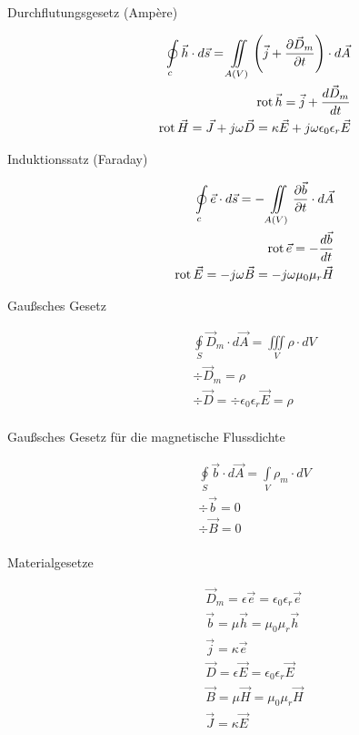 \begin{description}
\item[Durchflutungsgesetz (Ampère)]
\begin{align*}
\oint\limits_c \vec{h} \cdot d\vec{s} = \iint\limits_{A(V)} \left( \vec{j} + \frac{\partial \vec{D}_m}{\partial t}\right ) \cdot d\vec{A} \\
\text{rot}\, \vec{h} = \vec{j} + \frac{d \vec{D}_m}{d t} \\
\text{rot}\, \vec{H} = \vec{J} + j\omega \vec{D} = \kappa \vec{E} + j\omega \epsilon_0 \epsilon_r \vec{E} \\
\end{align*}

\item[Induktionssatz (Faraday)]
\begin{align*}
\oint\limits_c \vec{e} \cdot d\vec{s} = - \iint\limits_{A(V)} \frac{\partial \vec{b}}{\partial t} \cdot d\vec{A} \\
\text{rot}\, \vec{e} = - \frac{d \vec{b}}{d t} \\
\text{rot}\, \vec{E} = - j\omega\vec{B} = - j \omega \mu_0 \mu_r\vec{H}\\
\end{align*}

\item[Gaußsches Gesetz]
\begin{align*}
\oint\limits_S \vec{D}_m \cdot d\vec{A} = \iiint\limits_V \rho \cdot dV \\
\div{\vec{D}_m} = \rho \\
\div{\vec{D}} = \div{\epsilon_0 \epsilon_r \vec{E}} = \rho \\
\end{align*}

\item[Gaußsches Gesetz für die magnetische Flussdichte]
\begin{align*}
\oint\limits_S \vec{b} \cdot d\vec{A} = \int\limits_V \rho_m \cdot dV \\
\div{\vec{b}} = 0 \\
\div{\vec{B}} = 0\\
\end{align*}

\item[Materialgesetze]
\begin{align*}
\vec{D}_m = \epsilon\vec{e} = \epsilon_0 \epsilon_r \vec{e} \\
\vec{b} = \mu \vec{h} = \mu_0 \mu_r \vec{h} \\
\vec{j} = \kappa \vec{e} \\
\vec{D} = \epsilon\vec{E} = \epsilon_0 \epsilon_r \vec{E} \\
\vec{B} = \mu \vec{H} = \mu_0 \mu_r \vec{H} \\
\vec{J} = \kappa \vec{E}
\end{align*}


\end{description}
